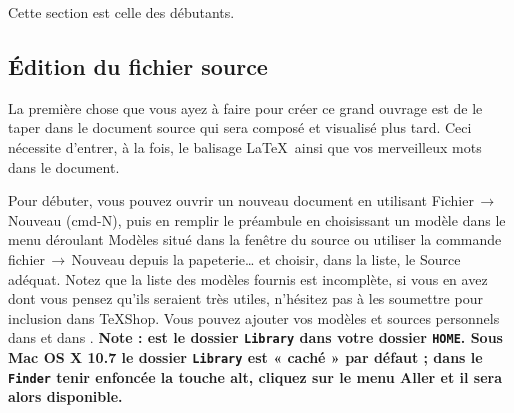 \documentclass[11pt,french]{article}
\newcommand{\TS}{\textsf{\TeX Shop}}
\newcommand{\cmd}[1]{\textsf{#1}}
\newcommand{\mnu}[1]{\textsf{#1}}
\newcommand{\To}{\,\(\to\)\,}
\begin{document}

Cette section est celle des débutants.


\subsection{Édition du fichier source}

La première chose que vous ayez à faire pour créer ce grand ouvrage est de le taper dans le document source qui sera composé et visualisé plus tard. Ceci nécessite d'entrer, à la fois, le balisage \LaTeX\ ainsi que vos merveilleux mots dans le document.


Pour débuter, vous pouvez ouvrir un nouveau document en utilisant \mnu{Fichier}\To\mnu{Nouveau} \mbox{(\cmd{cmd-N})}, puis en remplir le préambule en choisissant un modèle dans le menu déroulant \mnu{Modèles} situé dans la fenêtre du source ou utiliser la commande \mnu{fichier}\To\mnu{Nouveau depuis la papeterie…} et choisir, dans la liste, le \mnu{Source} adéquat. Notez que la liste des modèles fournis est incomplète, si vous en avez dont vous pensez qu'ils seraient très utiles, n'hésitez pas à les soumettre pour inclusion dans \TS. Vous pouvez ajouter vos modèles et sources personnels dans  et dans . \textbf {Note :  est le dossier \texttt{Library} dans votre dossier \texttt{HOME}. Sous \textsf{Mac OS X 10.7} le dossier \texttt{Library} est « caché » par défaut ; dans le \texttt{Finder} tenir enfoncée la touche \cmd{alt}, cliquez sur le menu \mnu{Aller} et il sera alors disponible.}

\end{document}
